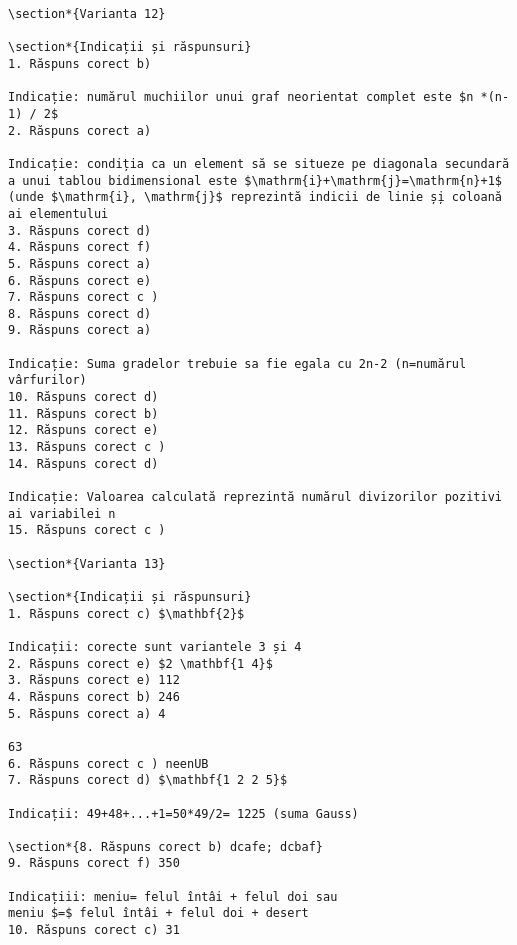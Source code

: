 \begin{verbatim}
\section*{Varianta 12}

\section*{Indicații și răspunsuri}
1. Răspuns corect b)

Indicație: numărul muchiilor unui graf neorientat complet este $n *(n-1) / 2$
2. Răspuns corect a)

Indicație: condiția ca un element să se situeze pe diagonala secundară a unui tablou bidimensional este $\mathrm{i}+\mathrm{j}=\mathrm{n}+1$ (unde $\mathrm{i}, \mathrm{j}$ reprezintă indicii de linie ș̦i coloană ai elementului
3. Răspuns corect d)
4. Răspuns corect f)
5. Răspuns corect a)
6. Răspuns corect e)
7. Răspuns corect c )
8. Răspuns corect d)
9. Răspuns corect a)

Indicație: Suma gradelor trebuie sa fie egala cu 2n-2 (n=numărul vârfurilor)
10. Răspuns corect d)
11. Răspuns corect b)
12. Răspuns corect e)
13. Răspuns corect c )
14. Răspuns corect d)

Indicație: Valoarea calculată reprezintă numărul divizorilor pozitivi ai variabilei n
15. Răspuns corect c )

\section*{Varianta 13}

\section*{Indicații și răspunsuri}
1. Răspuns corect c) $\mathbf{2}$

Indicații: corecte sunt variantele 3 și 4
2. Răspuns corect e) $2 \mathbf{1 4}$
3. Răspuns corect e) 112
4. Răspuns corect b) 246
5. Răspuns corect a) 4

63
6. Răspuns corect c ) neenUB
7. Răspuns corect d) $\mathbf{1 2 2 5}$

Indicații: 49+48+...+1=50*49/2= 1225 (suma Gauss)

\section*{8. Răspuns corect b) dcafe; dcbaf}
9. Răspuns corect f) 350

Indicațiii: meniu= felul întâi + felul doi sau
meniu $=$ felul întâi + felul doi + desert
10. Răspuns corect c) 31


\end{verbatim}
